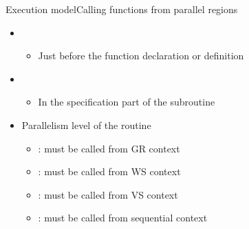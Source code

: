 \documentclass[12pt,aspectratio=169]{beamer}
\begin{document}
\begin{frame}[fragile]{Execution model}{Calling functions from parallel regions}
  \begin{itemize}
  \item {}
    \begin{itemize}
    \item Just before the function declaration or definition
    \end{itemize}
  \item {}
    \begin{itemize}
    \item In the specification part of the subroutine
    \end{itemize}
  \item Parallelism level of the routine
    \begin{itemize}
    \item {}: must be called from GR context
    \item {}: must be called from WS context
    \item {}: must be called from VS context
    \item {}: must be called from sequential context
    \end{itemize}
  \end{itemize}
\end{frame}
\end{document}
